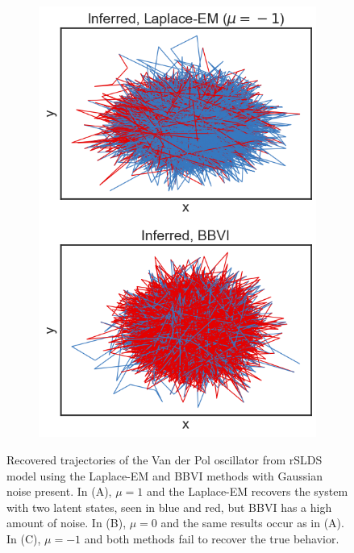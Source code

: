 \begin{figure}
\begin{subfigure}[b]{0.33\linewidth}
        \includegraphics[width=\linewidth]{./Figures/vdp-bad-mu-1.png}
        \caption{}
        \label{badvdp:c}
        \vspace{4ex}
    \end{subfigure}
    \caption{Recovered trajectories of the Van der Pol oscillator from rSLDS model using the Laplace-EM and BBVI methods with Gaussian noise present. In (A), $\mu = 1$ and the Laplace-EM recovers the system with two latent states, seen in blue and red, but BBVI has a high amount of noise. In (B), $\mu = 0$ and the same results occur as in (A). In (C), $\mu = -1$ and both methods fail to recover the true behavior.}
    \label{badvdp}
\end{figure}



